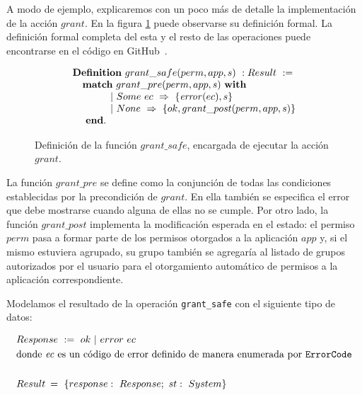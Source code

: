 A modo de ejemplo, explicaremos con un poco más de detalle la implementación de la acción $grant$.
En la figura \ref{fig:install_action} puede observarse su definición formal. La definición formal
completa del esta y el resto de las operaciones puede encontrarse en el código en
GitHub~\cite{github-code}.

\begin{figure}[ht]
    \begin{displaymath}
        \begin{array}{l}
            \textbf{Definition}\ grant\_safe(perm, app, s)\ : Result\ :=                \\
            \quad \textbf{match}\ grant\_pre(perm, app, s)\ \textbf{with}               \\
            \quad \hspace{1cm} |\ Some\ ec\ \Rightarrow\ \{\ap{error}{ec},s\}           \\
            \quad \hspace{1cm} |\ None\ \Rightarrow\ \{ok, grant\_post(perm, app, s) \} \\
            \quad\ \textbf{end}.                                                        \\
        \end{array}
    \end{displaymath}
    \caption{Definición de la función $grant\_safe$, encargada de ejecutar la acción $grant$.}
    \label{fig:install_action}
\end{figure}

La función $grant\_pre$ se define como la conjunción de todas las condiciones establecidas por la
precondición de $grant$. En ella también se especifica el error que debe mostrarse cuando alguna de
ellas no se cumple. Por otro lado, la función $grant\_post$ implementa la modificación esperada en
el estado: el permiso $perm$ pasa a formar parte de los permisos otorgados a la aplicación $app$ y,
si el mismo estuviera agrupado, su grupo también se agregaría al listado de grupos autorizados por
el usuario para el otorgamiento automático de permisos a la aplicación correspondiente.

Modelamos el resultado de la operación \texttt{grant\_safe} con el siguiente tipo de datos:

\begin{align*}
     & Response\ :=\ ok\ |\ error\ ec                                                                     \\
     & \text{donde \textit{ec} es un código de error definido de manera enumerada por \texttt{ErrorCode}} \\ \\
     & Result\:=\ \{response:\ Response;\ st:\ System\}                                                   \\
\end{align*}

